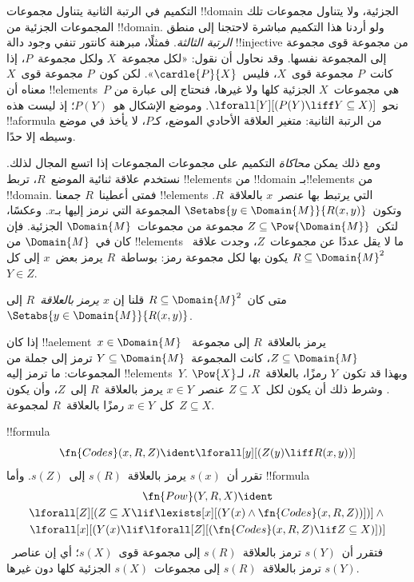 \documentclass[../../../include/open-logic-section]{subfiles}
\begin{document}


\begin{explain}
التكميم في الرتبة الثانية يتناول مجموعات !!{domain} الجزئية،
ولا يتناول مجموعات تلك المجموعات الجزئية من !!{domain}.
ولو أردنا هذا التكميم مباشرة لاحتجنا إلى منطق \emph{الرتبة الثالثة}.
فمثلًا، مبرهنة كانتور تنفي وجود دالة !!{injective} من مجموعة
قوى مجموعة إلى المجموعة نفسها. وقد نحاول أن نقول:
«لكل مجموعة~$X$ ولكل مجموعة~$P$، إذا كانت~$P$ مجموعة
قوى~$X$، فليس~$\cardle{P}{X}$».
لكن كون~$P$ مجموعة قوى~$X$ معناه أن !!{element}s~$P$
هي مجموعات~$X$ الجزئية كلها ولا غيرها، فنحتاج إلى عبارة
من نحو~$\lforall[Y][(P(Y) \liff Y \subseteq X)]$.
وموضع الإشكال هو~$P(Y)$؛ إذ ليست هذه !!a{formula} من الرتبة
الثانية: متغير العلاقة الأحادي الموضع، كـ$P$، لا يأخذ في موضع
وسيطه إلا حدًا.

ومع ذلك يمكن \emph{محاكاة} التكميم على مجموعات المجموعات
إذا اتسع المجال لذلك. نستخدم علاقة ثنائية الموضع~$R$،
تربط !!{element}s من !!{domain} بـ!!{element}s من !!{domain}.
فمتى أعطينا~$R$ جمعنا !!{element}s التي يرتبط بها عنصر~$x$
بالعلاقة~$R$. وتكون~$\Setabs{y \in \Domain{M}}{R(x,y)}$
المجموعة التي نرمز إليها بـ$x$.
وعكسًا، لتكن~$Z \subseteq \Pow{\Domain{M}}$ مجموعة من
مجموعات~$\Domain{M}$ الجزئية. فإن كان في~$\Domain{M}$ من
!!{element}s ما لا يقل عددًا عن مجموعات~$Z$، وجدت
علاقة~$R \subseteq \Domain{M}^2$ يكون بها لكل مجموعة رمز:
بوساطة~$R$ يرمز بعض~$x$ إلى كل~$Y \in Z$.
\end{explain}

\begin{defn}
متى كان~$R \subseteq \Domain{M}^2$ قلنا إن
\emph{$x$ يرمز بالعلاقة~$R$} إلى
$\Setabs{y \in \Domain{M}}{R(x, y)}$.
\end{defn}

إذا كان !!a{element}~$x \in \Domain{M}$ يرمز
بالعلاقة~$R$ إلى مجموعة~$Z \subseteq \Domain{M}$،
كانت المجموعة~$Y \subseteq \Domain{M}$ ترمز إلى جملة من المجموعات:
ما ترمز إليه !!{element}s~$Y$.
وبهذا قد تكون~$Y$ رمزًا، بالعلاقة~$R$، لـ$\Pow{X}$.
وشرط ذلك أن يكون لكل~$Z \subseteq X$ عنصر~$x \in Y$
يرمز بالعلاقة~$R$ إلى~$Z$، وأن يكون كل~$x \in Y$
رمزًا بالعلاقة~$R$ لمجموعة~$Z \subseteq X$.

\begin{prop}
!!{formula}
  \[
  \fn{Codes}(x, R, Z) \ident \lforall[y][(Z(y) \liff
    R(x, y))]
  \]
تقرر أن~$s(x)$ يرمز بالعلاقة~$s(R)$ إلى~$s(Z)$.
وأما !!{formula}
\begin{multline*}
  \fn{Pow}(Y, R, X) \ident \\
  \lforall[Z][(Z \subseteq X \lif \lexists[x][(Y(x) \land
    \fn{Codes}(x, R, Z))])] \land {} \\ \lforall[x][(Y(x) \lif
  \lforall[Z][(\fn{Codes}(x, R, Z) \lif Z \subseteq X)])]
\end{multline*}
فتقرر أن~$s(Y)$ ترمز بالعلاقة~$s(R)$ إلى مجموعة قوى~$s(X)$؛
أي إن عناصر~$s(Y)$ ترمز بالعلاقة~$s(R)$ إلى مجموعات~$s(X)$
الجزئية كلها دون غيرها.
\end{prop}
\end{document}
